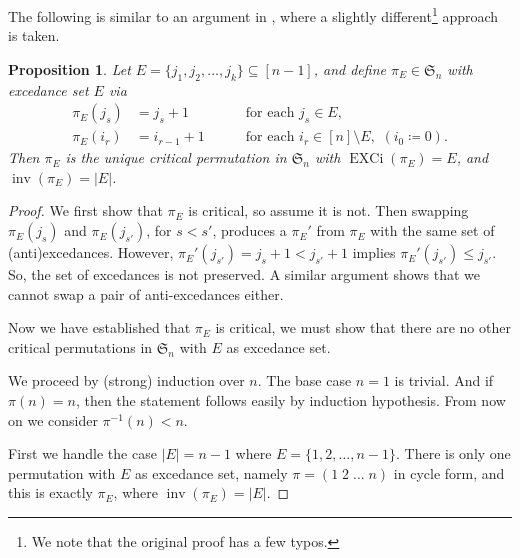 \documentclass[reqno]{amsart}
\newtheorem{proposition}[theorem]{Proposition}
\theoremstyle{definition}
\newcommand{\symS}{\mathfrak{S}}
\DeclareMathOperator{\inv}{inv}
\DeclareMathOperator{\EXCi}{EXCi}
\begin{document}
The following is similar to an argument in \cite{Mantaci1993},
where a slightly different\footnote{We note that the original proof has a few typos.}
approach is taken.
\begin{proposition}\label{prop:mantaciInvolution}
	Let $E=\{j_1,j_2,\dotsc,j_k\} \subseteq [n-1]$, and define $\pi_E \in \symS_n$
	with excedance set $E$ via
	\begin{align*}
		\pi_E(j_s) &=j_s+1 \quad &&\text{ for each } j_s\in E, \\
		\pi_E(i_r) &=i_{r-1}+1\quad &&\text{ for each } i_r\in [n]\setminus E, \,\,(i_0 \coloneqq 0).
	\end{align*}
	Then $\pi_E$ is the unique critical permutation in $\symS_n$ with $\EXCi(\pi_E)=E$,
	and $\inv(\pi_E)=|E|$.
\end{proposition}
\begin{proof}
	We first show that $\pi_E$ is critical, so assume it is not. 
	Then swapping $\pi_E(j_{s})$ and $\pi_E(j_{s'})$, for $s < s'$,
	produces a $\pi_E'$ from $\pi_E$ with the same set of (anti)excedances. However, $\pi_E'(j_{s'}) = j_s+1 < j_{s'}+1$ implies $\pi_E'(j_{s'})\leq j_{s'}$. 
	So, the set of excedances is not preserved.
	A similar argument shows that we cannot swap a pair of anti-excedances
	either.
	
	Now we have established that $\pi_E$ is critical, we must show that
	there are no other critical permutations in $\symS_n$ with $E$ as excedance set.
	
	We proceed by (strong) induction over $n$.  The base case $n=1$ is trivial. And if $\pi(n)=n$, then the statement follows easily by induction hypothesis. From now on we consider $\pi^{-1}(n)<n$.
	
	First we handle the case $|E|=n-1$ where $E = \{1,2,\dotsc,n-1\}$.
	There is only one permutation with $E$ as excedance set,
	namely $\pi = (1\;2\; \dotsc \; n)$ in cycle form, and this is exactly $\pi_E$,
	where $\inv(\pi_E)=|E|$.
	

\end{proof}
\end{document}
